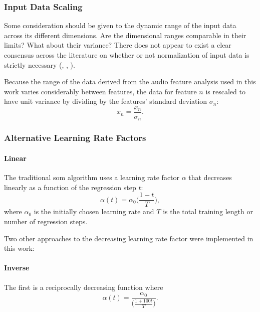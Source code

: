 \subsubsection{Input Data Scaling}
\label{subsubsec:som_input_normalization}
Some consideration should be given to the dynamic range of the input data across
its different dimensions. Are the dimensional ranges comparable in their limits?
What about their variance? There does not appear to exist a clear consensus
across the literature on whether or not normalization of input data is strictly
necessary (\citet[p.34]{vesanto2000}, \citet[p.1470]{kohonen1990},
\citet{web:kohonen2007}).

Because the range of the data derived from the audio
feature analysis used in this work varies considerably between features, the
data for feature $n$ is rescaled to have unit variance by dividing by the
features' standard deviation $\sigma_n$:
\begin{equation}
  x_{n} = \frac{x_{n}}{\sigma_n}.
\end{equation}

\subsubsection{Alternative Learning Rate Factors}
\label{subsubsec:som_learning_rates}

\paragraph{Linear}
\label{para:alpha_linear}
The traditional \gls{som} algorithm uses a learning rate factor $\alpha$ that
decreases linearly as a function of the regression step $t$:
\begin{equation}
  \alpha(t) = \alpha_0 \bigg(\frac{1 - t}{T}\bigg),
\end{equation}
where $\alpha_0$ is the initially chosen learning rate and $T$ is the total
training length or number of regression steps.
\bigskip

Two other approaches to the decreasing learning rate factor were implemented
in this work:

\paragraph{Inverse}
\label{para:alpha_inverse}
The first is a reciprocally decreasing function where
\begin{equation}
  \alpha(t) = \frac{\alpha_0}{\big(\frac{1 + 100t}{T}\big)}.
\end{equation}

